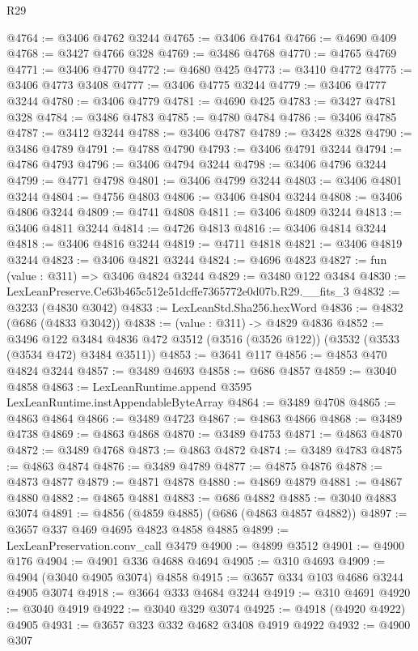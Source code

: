 \begin{lexlean}{R29}
\begin{coremodule}
@4764 := @3406 @4762 @3244
@4765 := @3406 @4764
@4766 := @4690 @409
@4768 := @3427 @4766 @328
@4769 := @3486 @4768
@4770 := @4765 @4769
@4771 := @3406 @4770
@4772 := @4680 @425
@4773 := @3410 @4772
@4775 := @3406 @4773 @3408
@4777 := @3406 @4775 @3244
@4779 := @3406 @4777 @3244
@4780 := @3406 @4779
@4781 := @4690 @425
@4783 := @3427 @4781 @328
@4784 := @3486 @4783
@4785 := @4780 @4784
@4786 := @3406 @4785
@4787 := @3412 @3244
@4788 := @3406 @4787
@4789 := @3428 @328
@4790 := @3486 @4789
@4791 := @4788 @4790
@4793 := @3406 @4791 @3244
@4794 := @4786 @4793
@4796 := @3406 @4794 @3244
@4798 := @3406 @4796 @3244
@4799 := @4771 @4798
@4801 := @3406 @4799 @3244
@4803 := @3406 @4801 @3244
@4804 := @4756 @4803
@4806 := @3406 @4804 @3244
@4808 := @3406 @4806 @3244
@4809 := @4741 @4808
@4811 := @3406 @4809 @3244
@4813 := @3406 @4811 @3244
@4814 := @4726 @4813
@4816 := @3406 @4814 @3244
@4818 := @3406 @4816 @3244
@4819 := @4711 @4818
@4821 := @3406 @4819 @3244
@4823 := @3406 @4821 @3244
@4824 := @4696 @4823
@4827 := fun (value : @311) => @3406 @4824 @3244
@4829 := @3480 @122 @3484
@4830 := LexLeanPreserve.Ce63b465c512e51dcffe7365772e0d07b.R29.__fits_3
@4832 := @3233 (@4830 @3042)
@4833 := LexLeanStd.Sha256.hexWord
@4836 := @4832 (@686 (@4833 @3042))
@4838 := (value : @311) -> @4829 @4836
@4852 := @3496
    @122
    @3484
    @4836
    @472
    @3512
    (@3516 (@3526 @122))
    (@3532 (@3533 (@3534 @472) @3484 @3511))
@4853 := @3641 @117
@4856 := @4853 @470 @4824 @3244
@4857 := @3489 @4693
@4858 := @686 @4857
@4859 := @3040 @4858
@4863 := LexLeanRuntime.append @3595 LexLeanRuntime.instAppendableByteArray
@4864 := @3489 @4708
@4865 := @4863 @4864
@4866 := @3489 @4723
@4867 := @4863 @4866
@4868 := @3489 @4738
@4869 := @4863 @4868
@4870 := @3489 @4753
@4871 := @4863 @4870
@4872 := @3489 @4768
@4873 := @4863 @4872
@4874 := @3489 @4783
@4875 := @4863 @4874
@4876 := @3489 @4789
@4877 := @4875 @4876
@4878 := @4873 @4877
@4879 := @4871 @4878
@4880 := @4869 @4879
@4881 := @4867 @4880
@4882 := @4865 @4881
@4883 := @686 @4882
@4885 := @3040 @4883 @3074
@4891 := @4856 (@4859 @4885) (@686 (@4863 @4857 @4882))
@4897 := @3657 @337 @469 @4695 @4823 @4858 @4885
@4899 := LexLeanPreservation.conv_call @3479
@4900 := @4899 @3512
@4901 := @4900 @176
@4904 := @4901 @336 @4688 @4694
@4905 := @310 @4693
@4909 := @4904 (@3040 @4905 @3074) @4858
@4915 := @3657 @334 @103 @4686 @3244 @4905 @3074
@4918 := @3664 @333 @4684 @3244
@4919 := @310 @4691
@4920 := @3040 @4919
@4922 := @3040 @329 @3074
@4925 := @4918 (@4920 @4922) @4905
@4931 := @3657 @323 @332 @4682 @3408 @4919 @4922
@4932 := @4900 @307

\end{coremodule}
\end{lexlean}
